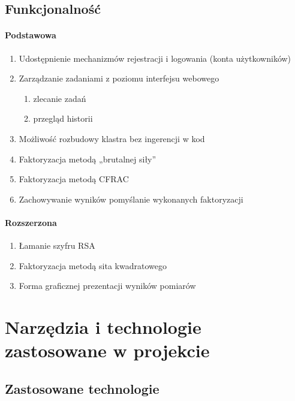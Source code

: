 \documentclass{article}
\begin{document}
\subsection{Funkcjonalność}

\paragraph{Podstawowa}
\begin{enumerate}
	\item Udostępnienie mechanizmów rejestracji i logowania (konta użytkowników)
	\item Zarządzanie zadaniami z poziomu interfejsu webowego
	\begin{enumerate}
		\item zlecanie zadań
		\item przegląd historii
	\end{enumerate}
	\item Możliwość rozbudowy klastra bez ingerencji w kod
	\item Faktoryzacja metodą „brutalnej siły”
	\item Faktoryzacja metodą CFRAC
	\item Zachowywanie wyników pomyślanie wykonanych faktoryzacji
\end{enumerate}

\paragraph{Rozszerzona}
\begin{enumerate}
    \item Łamanie szyfru RSA
    \item Faktoryzacja metodą sita kwadratowego
    \item Forma graficznej prezentacji wyników pomiarów
\end{enumerate}

\section{Narzędzia i technologie zastosowane w projekcie}
\subsection{Zastosowane technologie}
\end{document}
